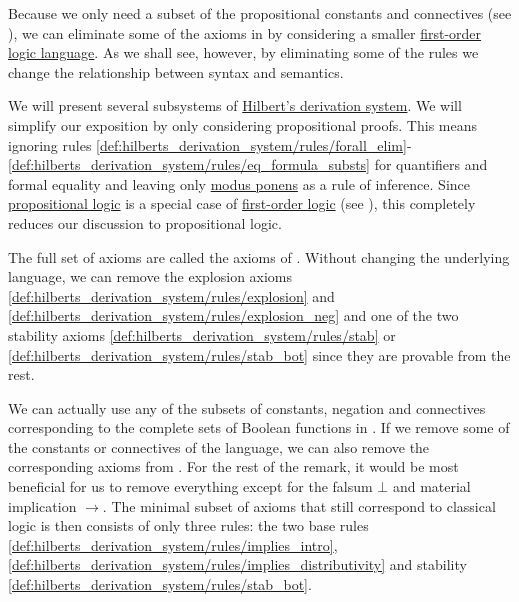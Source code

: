 \begin{remark}\label{rem:hilberts_derivation_system_axioms}
  Because we only need a subset of the propositional constants and connectives (see ), we can eliminate some of the axioms in  by considering a smaller \hyperref[def:first_order_language]{first-order logic language}. As we shall see, however, by eliminating some of the rules we change the relationship between syntax and semantics.

  We will present several subsystems of \hyperref[def:hilberts_derivation_system]{Hilbert's derivation system}. We will simplify our exposition by only considering propositional proofs. This means ignoring rules \eqref{def:hilberts_derivation_system/rules/forall_elim}-\eqref{def:hilberts_derivation_system/rules/eq_formula_substs} for quantifiers and formal equality and leaving only \hyperref[def:hilberts_derivation_system/rules/modus_ponens]{modus ponens} as a rule of inference. Since \hyperref[subsec:language_of_propositional_logic]{propositional logic} is a special case of \hyperref[subsec:language_of_first_order_logic]{first-order logic} (see ), this completely reduces our discussion to propositional logic.

  \begin{RemEnum}
     The full set of axioms are called the axioms of . Without changing the underlying language, we can remove the explosion axioms \eqref{def:hilberts_derivation_system/rules/explosion} and \eqref{def:hilberts_derivation_system/rules/explosion_neg} and one of the two stability axioms \eqref{def:hilberts_derivation_system/rules/stab} or \eqref{def:hilberts_derivation_system/rules/stab_bot} since they are provable from the rest.

    We can actually use any of the subsets of constants, negation and connectives corresponding to the complete sets of Boolean functions in . If we remove some of the constants or connectives of the language, we can also remove the corresponding axioms from . For the rest of the remark, it would be most beneficial for us to remove everything except for the falsum \( \bot \) and material implication \( \rightarrow \). The minimal subset of axioms that still correspond to classical logic is then consists of only three rules: the two base rules \eqref{def:hilberts_derivation_system/rules/implies_intro}, \eqref{def:hilberts_derivation_system/rules/implies_distributivity} and stability \eqref{def:hilberts_derivation_system/rules/stab_bot}.


\end{RemEnum}
\end{remark}

